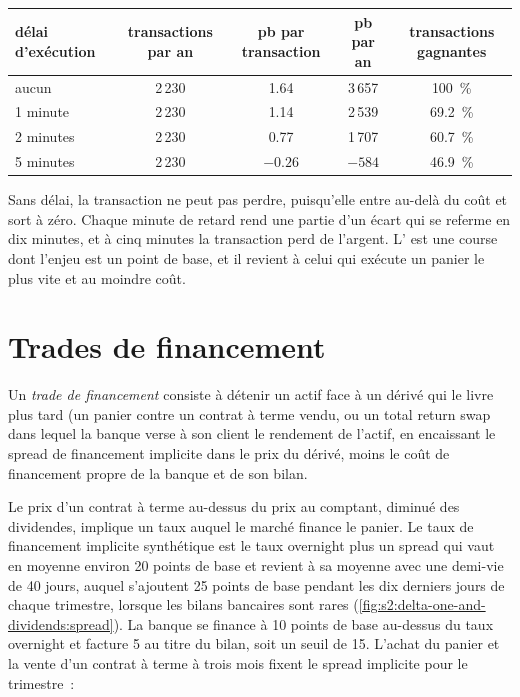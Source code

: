 \begin{center}
\small
\begin{tabular}{@{}lcccc@{}}
\toprule
délai d'exécution & transactions par an & pb par transaction & pb par an & transactions gagnantes\\
\midrule
aucun & 2\,230 & 1.64 & 3\,657 & 100~\%\\
1 minute & 2\,230 & 1.14 & 2\,539 & 69.2~\%\\
2 minutes & 2\,230 & 0.77 & 1\,707 & 60.7~\%\\
5 minutes & 2\,230 & $-0.26$ & $-584$ & 46.9~\%\\
\bottomrule
\end{tabular}
\end{center}

Sans délai, la transaction ne peut pas perdre, puisqu'elle entre au-delà du coût et sort à zéro. Chaque minute de retard rend une partie d'un écart qui se referme en
dix minutes, et à cinq minutes la transaction perd de l'argent. L' est une course dont l'enjeu est un point de base, et il revient à celui qui exécute un panier
le plus vite et au moindre coût.

\section{Trades de financement}

\begin{definition}\label{def:s2:delta-one-and-dividends:financing}
Un \emph{trade de financement} consiste à détenir un actif face à un dérivé qui le livre plus tard (un panier contre un contrat à terme vendu, ou un
total return swap dans lequel la banque verse à son client le rendement de l'actif, en encaissant le spread de financement implicite dans le prix du dérivé, moins le
coût de financement propre de la banque et de son bilan.
\end{definition}

Le prix d'un contrat à terme au-dessus du prix au comptant, diminué des dividendes, implique un taux auquel le marché finance le panier. Le taux de financement implicite synthétique est le taux overnight
plus un spread qui vaut en moyenne environ 20 points de base et revient à sa moyenne avec une demi-vie de 40 jours, auquel s'ajoutent 25 points de base pendant les dix derniers jours de chaque trimestre,
lorsque les bilans bancaires sont rares (\cref{fig:s2:delta-one-and-dividends:spread}). La banque se finance à 10 points de base au-dessus du taux overnight
et facture 5 au titre du bilan, soit un seuil de 15. L'achat du panier et la vente d'un contrat à terme à trois mois fixent le spread implicite pour le trimestre~:

